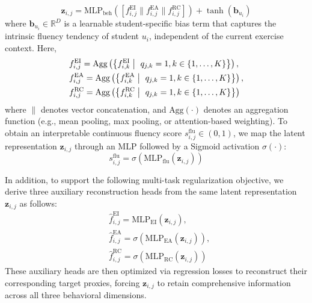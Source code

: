 \documentclass[a4paper,runningheads]{llncs}
\begin{document}
\begin{equation}
    \bm{z}_{i,j} = \text{MLP}_{\text{beh}}\left(\left[f_{i,j}^{\text{EI}} \parallel f_{i,j}^{\text{EA}} \parallel f_{i,j}^{\text{RC}}\right] \right) + \tanh\left(\bm{b}_{u_i}\right)
\end{equation}
where $\bm{b}_{u_i} \in \mathbb{R}^D$ is a learnable student-specific bias term that captures the intrinsic fluency tendency of student $u_i$, independent of the current exercise context.
Here,
\begin{align}
&f_{i,j}^{\text{EI}} = \text{Agg}\left(\left\{f_{i,k}^{\text{EI}} \bigm| \ q_{j,k} = 1, k \in \{1,\dots,K\}\right\}\right),\\
&f_{i,j}^{\text{EA}} = \text{Agg}\left(\left\{f_{i,k}^{\text{EA}} \bigm| \ q_{j,k} = 1, k \in \{1,\dots,K\}\right\}\right),\\
&f_{i,j}^{\text{RC}} = \text{Agg}\left(\left\{f_{i,k}^{\text{RC}} \bigm| \ q_{j,k} = 1, k \in \{1,\dots,K\}\right\}\right)
\end{align}
where $\parallel$ denotes vector concatenation, and $\text{Agg}(\cdot)$ denotes an aggregation function (e.g., mean pooling, max pooling, or attention-based weighting).
To obtain an interpretable continuous fluency score $s_{i,j}^{\text{flu}} \in (0,1)$, we map the latent representation $\bm{z}_{i,j}$ through an MLP followed by a Sigmoid activation $\sigma(\cdot)$:
\begin{equation}
    s_{i,j}^{\text{flu}} = \sigma\left(\text{MLP}_{\text{flu}}\left(\bm{z}_{i,j}\right)\right)
\end{equation}

In addition, to support the following multi-task regularization objective, we derive three auxiliary reconstruction heads from the same latent representation $\bm{z}_{i,j}$ as follows:
\begin{align}
&\hat{f}_{i,j}^{\text{EI}} = \text{MLP}_{\text{EI}}\left(\bm{z}_{i,j}\right),\\
&\hat{f}_{i,j}^{\text{EA}} = \sigma\left(\text{MLP}_{\text{EA}}\left(\bm{z}_{i,j}\right)\right),\\
&\hat{f}_{i,j}^{\text{RC}} = \sigma\left(\text{MLP}_{\text{RC}}\left(\bm{z}_{i,j}\right)\right)
\end{align}
These auxiliary heads are then optimized via regression losses to reconstruct their corresponding target proxies, forcing $\bm{z}_{i,j}$ to retain comprehensive information across all three behavioral dimensions.
\end{document}
